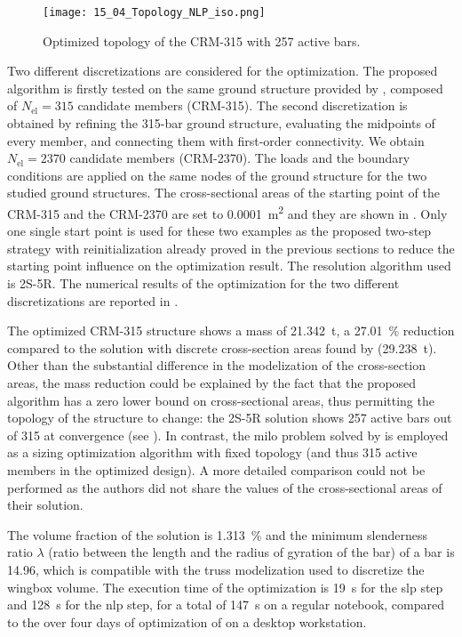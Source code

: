     \begin{figure}
        \centering
        \texttt{[image: 15\_04\_Topology\_NLP\_iso.png]}
         \caption{Optimized topology of the CRM-315 with 257 active bars.}
        \label{fig:crm315}
    \end{figure}
    
    Two different discretizations are considered for the optimization. The proposed algorithm is firstly tested on the same ground structure provided by \cite{fakhimi_discrete_2021}, composed of $N_{\text{el}}=315$ candidate members (CRM-315). The second discretization is obtained by refining the 315-bar ground structure, evaluating the midpoints of every member, and connecting them with first-order connectivity. We obtain $N_{\text{el}}=2370$ candidate members (CRM-2370). The loads and the boundary conditions are applied on the same nodes of the ground structure for the two studied ground structures. The cross-sectional areas of the starting point of the CRM-315 and the CRM-2370 are set to \qty{0.0001}{m^2} and they are shown in . Only one single start point is used for these two examples as the proposed two-step strategy with reinitialization already proved in the previous sections to reduce the starting point influence on the optimization result. The resolution algorithm used is 2S-5R. The numerical results of the optimization for the two different discretizations are reported in . 
    
    The optimized CRM-315 structure shows a mass of \qty{21.342}{\tonne}, a \qty{27.01}{\%} reduction compared to the solution with discrete cross-section areas found by \cite{fakhimi_discrete_2021}  (\qty{29.238}{\tonne}). Other than the substantial difference in the modelization of the cross-section areas, the mass reduction could be explained by the fact that the proposed algorithm has a zero lower bound on cross-sectional areas, thus permitting the topology of the structure to change: the 2S-5R solution shows 257 active bars out of 315 at convergence (see ). In contrast, the \gls{milo} problem solved by \cite{fakhimi_discrete_2021} is employed as a sizing optimization algorithm with fixed topology (and thus 315 active members in the optimized design). A more detailed comparison could not be performed as the authors did not share the values of the cross-sectional areas of their solution. 
    
    The volume fraction of the solution is \qty{1.313}{\percent} and the minimum slenderness ratio $\lambda$ (ratio between the length and the radius of gyration of the bar) of a bar is 14.96, which is compatible with the truss modelization used to discretize the wingbox volume. The execution time of the optimization is \qty{19}{s} for the \gls{slp} step and \qty{128}{s} for the \gls{nlp} step, for a total of \qty{147}{s} on a regular notebook, compared to the over four days of optimization of \cite{fakhimi_discrete_2021} on a desktop workstation. 

